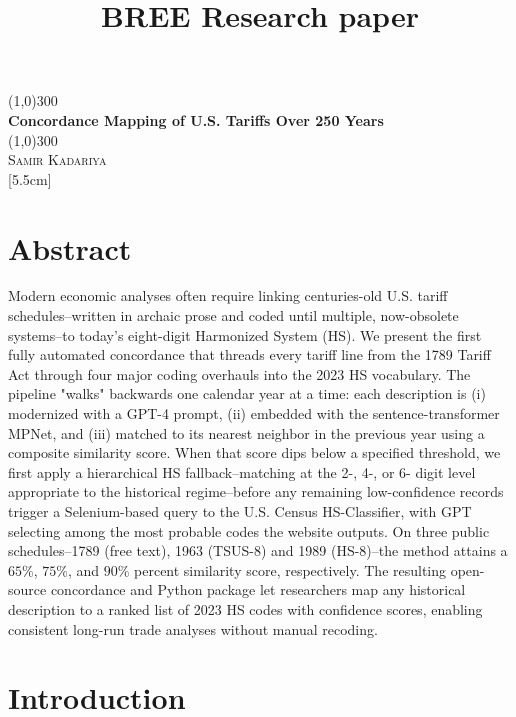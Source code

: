\documentclass[12pt]{article}
\title{BREE Research paper}
\begin{document}
\begin{titlepage}
	\begin{center}
    \line(1,0){300}\\
    [0.65cm]
	\huge{\bfseries Concordance Mapping of U.S. Tariffs Over 250 Years}\\
	\line(1,0){300}\\
	\textsc{\Large Samir Kadariya}\\
	[5.5cm]     
	\end{center}

\end{titlepage}

\tableofcontents

\newpage

\section{Abstract}
Modern economic analyses often require linking centuries-old U.S. tariff schedules--written in archaic prose and coded until multiple, now-obsolete systems--to today's eight-digit Harmonized System (HS). We present the first fully automated concordance that threads every tariff line from the 1789 Tariff Act through four major coding overhauls into the 2023 HS vocabulary. The pipeline "walks" backwards one calendar year at a time: each description is (i) modernized with a GPT-4 prompt, (ii) embedded with the sentence-transformer MPNet, and (iii) matched to its nearest neighbor in the previous year using a composite similarity score. When that score dips below a specified threshold, we first apply a hierarchical HS fallback--matching at the 2-, 4-, or 6- digit level appropriate to the historical regime--before any remaining low-confidence records trigger a Selenium-based query to the U.S. Census HS-Classifier, with GPT selecting among the most probable codes the website outputs. On three public schedules--1789 (free text), 1963 (TSUS-8) and 1989 (HS-8)--the method attains a $65\%$, $75\%$, and $90\%$ percent similarity score, respectively.  The resulting open-source concordance and Python package let researchers map any historical description to a ranked list of 2023 HS codes with confidence scores, enabling consistent long-run trade analyses without manual recoding. 

\section{Introduction}
\end{document}
